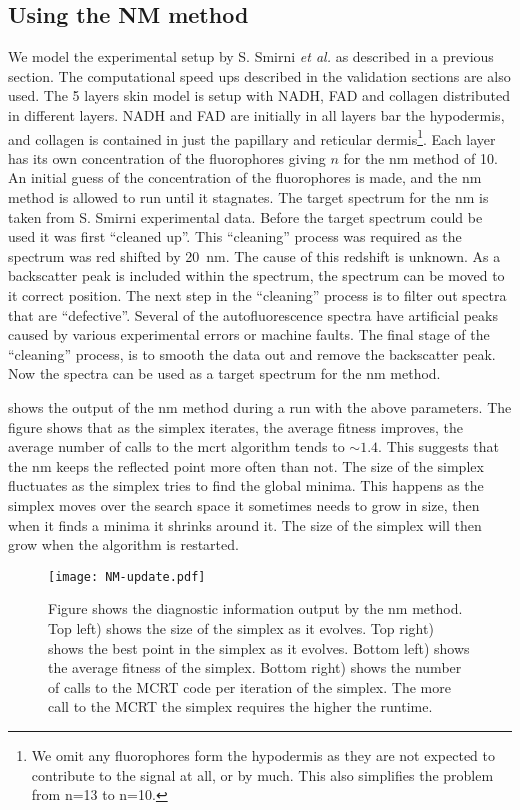 \subsection*{Using the NM method}

We model the experimental setup by S. Smirni \textit{et al.} as described in a previous section.
The computational speed ups described in the validation sections are also used.
The 5 layers skin model is setup with NADH, FAD and collagen distributed in different layers.
NADH and FAD are initially in all layers bar the hypodermis, and collagen is contained in just the papillary and reticular dermis\footnote{We omit any fluorophores form the hypodermis as they are not expected to contribute to the signal at all, or by much. This also simplifies the problem from n=13 to n=10.}.
Each layer has its own concentration of the fluorophores giving $n$ for the \gls*{nm} method of 10.
An initial guess of the concentration of the fluorophores is made, and the \gls*{nm} method is allowed to run until it stagnates.
The target spectrum for the \gls*{nm} is taken from S. Smirni experimental data.
Before the target spectrum could be used it was first ``cleaned up''.
This ``cleaning'' process was required as the spectrum was red shifted by 20~nm.
The cause of this redshift is unknown.
As a backscatter peak is included within the spectrum, the spectrum can be moved to it correct position.
The next step in the ``cleaning'' process is to filter out spectra that are ``defective''.
Several of the autofluorescence spectra have artificial peaks caused by various experimental errors or machine faults.
The final stage of the ``cleaning'' process, is to smooth the data out and remove the backscatter peak. 
Now the spectra can be used as a target spectrum for the \gls*{nm} method.

 shows the output of the \gls*{nm} method during a run with the above parameters.
The figure shows that as the simplex iterates, the average fitness improves, the average number of calls to the \gls*{mcrt} algorithm tends to $\sim 1.4$.
This suggests that the \gls*{nm} keeps the reflected point more often than not.
The size of the simplex fluctuates as the simplex tries to find the global minima.
This happens as the simplex moves over the search space it sometimes needs to grow in size, then when it finds a minima it shrinks around it.
The size of the simplex will then grow when the algorithm is restarted.

\begin{figure}[!htpb]
  \centering
  \texttt{[image: NM-update.pdf]}
  \caption{Figure shows the diagnostic information output by the \gls*{nm} method. Top left) shows the size of the simplex as it evolves. Top right) shows the best point in the simplex as it evolves. Bottom left) shows the average fitness of the simplex. Bottom right) shows the number of calls to the MCRT code per iteration of the simplex. The more call to the MCRT the simplex requires the higher the runtime.}
  \label{fig:NMupdate}
\end{figure}

